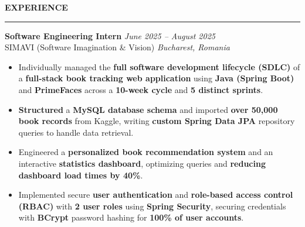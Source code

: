 \documentclass[10pt,letterpaper]{article}
\newenvironment{rSection}[1]{
  \vspace{4pt}
  {\bfseries\MakeUppercase{#1}}
  \vspace{2pt}
  \hrule
  \vspace{3pt}
}{
  \par\vspace{2pt}
}
\begin{document}
\vspace{-0.2cm}
\begin{rSection}{Experience}
\textbf{Software Engineering Intern} \hfill \textit{June 2025 – August 2025} \\
SIMAVI (Software Imagination \& Vision) \hfill \textit{Bucharest, Romania}
\begin{itemize}
    \item Individually managed the \textbf{full software development lifecycle (SDLC)} of a \textbf{full-stack book tracking web application} using \textbf{Java (Spring Boot)} and \textbf{PrimeFaces} across a \textbf{10-week cycle} and \textbf{5 distinct sprints}.
    \item \textbf{Structured} a \textbf{MySQL database schema} and imported \textbf{over 50,000 book records} from Kaggle, writing \textbf{custom Spring Data JPA} repository queries to handle data retrieval.
    \item Engineered a \textbf{personalized book recommendation system} and an interactive \textbf{statistics dashboard}, optimizing queries and \textbf{reducing dashboard load times by 40\%}.
    \item Implemented secure \textbf{user authentication} and \textbf{role-based access control (RBAC)} with \textbf{2 user roles} using \textbf{Spring Security}, securing credentials with \textbf{BCrypt} password hashing for \textbf{100\% of user accounts}.
\end{itemize}
\end{rSection}
\end{document}
